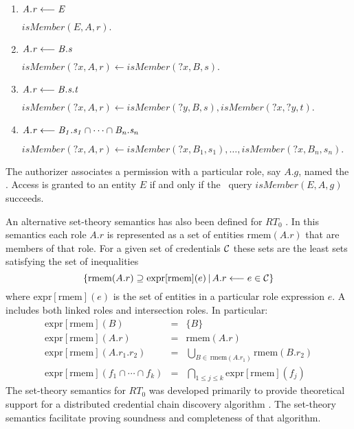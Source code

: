 \begin{enumerate}

\item $\mathit{A.r} \stackrel{}{\longleftarrow} \mathit{E}$

$\textit{isMember}(E, A, r).$

\item $\mathit{A.r} \stackrel{}{\longleftarrow} \mathit{B.s}$

$\textit{isMember}(\textit{?x}, A, r) \leftarrow
 \textit{isMember}(\textit{?x}, B, s).$

\item $\mathit{A.r} \stackrel{}{\longleftarrow} \mathit{B.s.t}$

$\textit{isMember}(\textit{?x}, A, r) \leftarrow
 \textit{isMember}(\textit{?y}, B, s),
 \textit{isMember}(\textit{?x}, \textit{?y}, t).$

\item $\mathit{A.r} \stackrel{}{\longleftarrow} \mathit{B_1.s_1 \cap \cdots \cap B_n.s_n}$

$\textit{isMember}(\textit{?x}, A, r) \leftarrow
 \textit{isMember}(\textit{?x}, B_1, s_1), \ldots,
 \textit{isMember}(\textit{?x}, B_n, s_n).$

\end{enumerate}

The authorizer associates a permission with a particular role, say $A.g$, named the
. Access is granted to an entity $E$ if and only if the \datalog\ query
$\textit{isMember}(E, A, g)$ succeeds.

An alternative set-theory semantics has also been defined for $RT_0$ \cite{Li:DCDTM}. In this
semantics each role $A.r$ is represented as a set of entities $\mbox{rmem}(A.r)$ that are
members of that role. For a given set of credentials $\mathcal{C}$ these sets are the least sets
satisfying the set of inequalities
\begin{displaymath}
\{ \mbox{rmem}(A.r) \supseteq \mbox{expr}[\mbox{rmem}](e)\,|\,
   A.r \longleftarrow e \in \mathcal{C} \}
\end{displaymath}
where $\mbox{expr}[\mbox{rmem}](e)$ is the set of entities in a particular role expression $e$.
A  includes both linked roles and intersection roles. In particular:
\begin{eqnarray*}
\mbox{expr}[\mbox{rmem}](B)        & = & \{B\}            \\
\mbox{expr}[\mbox{rmem}](A.r)      & = & \mbox{rmem}(A.r) \\
\mbox{expr}[\mbox{rmem}](A.r_1.r_2) & = &
  \bigcup_{B \in\, \mbox{rmem}(A.r_1)} \mbox{rmem}(B.r_2) \\
\mbox{expr}[\mbox{rmem}](f_1 \cap \cdots \cap f_k) & = &
  \bigcap_{1 \le j \le k} \mbox{expr}[\mbox{rmem}](f_j)
\end{eqnarray*}
The set-theory semantics for $RT_0$ was developed primarily to provide theoretical support for
a distributed credential chain discovery algorithm \cite{Li:DCDTM}. The set-theory semantics
facilitate proving soundness and completeness of that algorithm.

